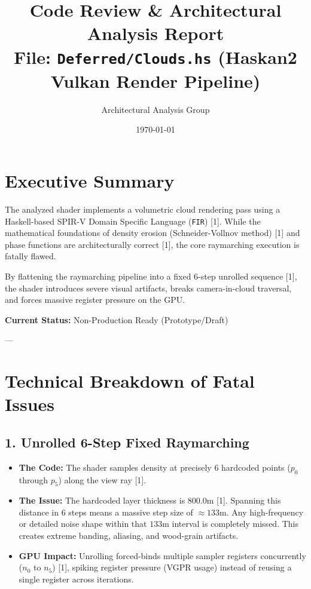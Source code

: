 \documentclass[11pt,a4paper]{article}
\title{Code Review \& Architectural Analysis Report \\ \large File: \texttt{Deferred/Clouds.hs} (Haskan2 Vulkan Render Pipeline)}
\author{Architectural Analysis Group}
\date{\today}
\begin{document}
\maketitle

\section{Executive Summary}
The analyzed shader implements a volumetric cloud rendering pass using a Haskell-based SPIR-V Domain Specific Language (\texttt{FIR}) [1]. While the mathematical foundations of density erosion (Schneider-Vollnov method) [1] and phase functions are architecturally correct [1], the core raymarching execution is fatally flawed. 

By flattening the raymarching pipeline into a fixed 6-step unrolled sequence [1], the shader introduces severe visual artifacts, breaks camera-in-cloud traversal, and forces massive register pressure on the GPU.

\textbf{Current Status:} Non-Production Ready (Prototype/Draft)

---

\section{Technical Breakdown of Fatal Issues}

\subsection{1. Unrolled 6-Step Fixed Raymarching}
\begin{itemize}
    \item \textbf{The Code:} The shader samples density at precisely 6 hardcoded points ($p_0$ through $p_5$) along the view ray [1].
    \item \textbf{The Issue:} The hardcoded layer thickness is $800.0\text{m}$ [1]. Spanning this distance in 6 steps means a massive step size of $\approx 133\text{m}$. Any high-frequency or detailed noise shape within that $133\text{m}$ interval is completely missed. This creates extreme banding, aliasing, and wood-grain artifacts.
    \item \textbf{GPU Impact:} Unrolling forced-binds multiple sampler registers concurrently ($n_0$ to $n_5$) [1], spiking register pressure (VGPR usage) instead of reusing a single register across iterations.
\end{itemize}
\end{document}
